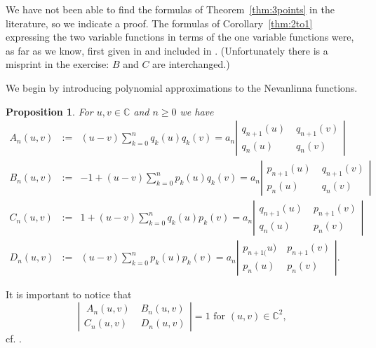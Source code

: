 \documentclass [12pt]{article}
\newtheorem{prop}[thm]{Proposition}
\newcommand{\C}{\mathbb{C}}
\def\ph{\phantom{-}}
\def\p{\ph}
\begin{document}
We have not been able to find the formulas of Theorem~\ref{thm:3points} in the literature, so we indicate a proof.  The formulas of Corollary~\ref{thm:2to1} expressing the two variable functions in terms of the one variable functions were, as far as we know,  first  given in \cite{Bu:Ca} and included in \cite[exercise 7.8 (3)]{Sch}.  (Unfortunately there is a misprint in the exercise: $B$ and $C$ are interchanged.)

We begin by introducing polynomial approximations to the Nevanlinna functions.
 
\begin{prop}\cite[Proposition 5.24]{Sch}\label{thm:An-Dn} For $u,v\in\C$ and $n\ge 0$ we have
\begin{eqnarray*}
A_n(u,v)&:=&(u-v)\sum_{k=0}^nq_k(u)q_k(v)=
a_n\left|\begin{array}{cc}
 q_{n+1}(u)&\;q_{n+1}(v)\\q_{n}(u)&\;q_{n}(v)\end{array}\right|\\
B_n(u,v)&:=&-1+(u-v)\sum_{k=0}^n p_k(u)q_k(v)=
a_n\left|\begin{array}{cc}
p_{n+1}(u)&\;q_{n+1}(v)\\p_{n}(u)&\;q_{n}(v)\end{array}\right|\\
C_n(u,v)&:=&1+(u-v)\sum_{k=0}^n q_k(u)p_k(v)=
a_n\left|\begin{array}{cc}
q_{n+1}(u)&\;p_{n+1}(v)\\
q_{n}(u)&\;p_{n}(v)\end{array}\right|\\
D_n(u,v)&:=&(u-v)\sum_{k=0}^np_k(u)p_k(v)=
a_n\left|\begin{array}{cc}
p_{n+1(}u)&\;p_{n+1}(v)\\
p_{n}(u)&\;p_{n}(v)\end{array}\right|.
\end{eqnarray*}
\end{prop}

It is important to notice that
\begin{equation*}\label{eq:det4}
\left|\begin{array}{cc}\ A_n(u,v)&\;B_n(u,v)\\
 C_n(u,v)&\; D_n(u,v)\end{array}\right|=1\textrm{ for }(u,v)\in\mathbb
C^2,
\end{equation*}
cf. \cite[Equation(5.57)]{Sch}.

                               
\end{document}
